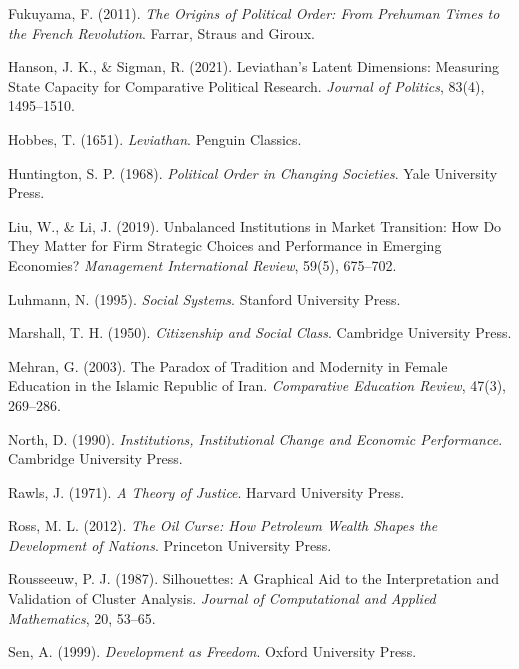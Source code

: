 \documentclass[12pt]{article}
\begin{document}
\begin{description}
\item Fukuyama, F. (2011). \textit{The Origins of Political Order: From Prehuman Times to the French Revolution}. Farrar, Straus and Giroux.

\item Hanson, J. K., \& Sigman, R. (2021). Leviathan's Latent Dimensions: Measuring State Capacity for Comparative Political Research. \textit{Journal of Politics}, 83(4), 1495–1510.

\item Hobbes, T. (1651). \textit{Leviathan}. Penguin Classics.

\item Huntington, S. P. (1968). \textit{Political Order in Changing Societies}. Yale University Press.

\item Liu, W., \& Li, J. (2019). Unbalanced Institutions in Market Transition: How Do They Matter for Firm Strategic Choices and Performance in Emerging Economies? \textit{Management International Review}, 59(5), 675–702.

\item Luhmann, N. (1995). \textit{Social Systems}. Stanford University Press.

\item Marshall, T. H. (1950). \textit{Citizenship and Social Class}. Cambridge University Press.

\item Mehran, G. (2003). The Paradox of Tradition and Modernity in Female Education in the Islamic Republic of Iran. \textit{Comparative Education Review}, 47(3), 269–286.

\item North, D. (1990). \textit{Institutions, Institutional Change and Economic Performance}. Cambridge University Press.

\item Rawls, J. (1971). \textit{A Theory of Justice}. Harvard University Press.

\item Ross, M. L. (2012). \textit{The Oil Curse: How Petroleum Wealth Shapes the Development of Nations}. Princeton University Press.

\item Rousseeuw, P. J. (1987). Silhouettes: A Graphical Aid to the Interpretation and Validation of Cluster Analysis. \textit{Journal of Computational and Applied Mathematics}, 20, 53–65.

\item Sen, A. (1999). \textit{Development as Freedom}. Oxford University Press.


\end{description}
\end{document}
